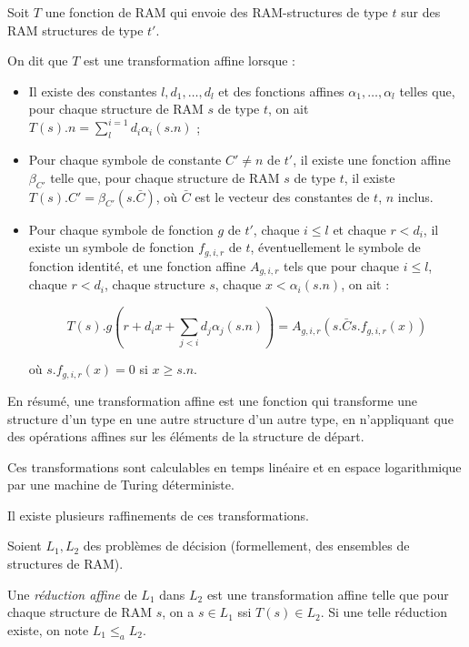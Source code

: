 		\begin{definition}
			\label{def:transfo_affine}
			Soit $T$ une fonction de RAM qui envoie des RAM-structures de type $t$ sur des RAM structures de type $t'$. 
			
			On dit que $T$ est une transformation affine lorsque : 
			
	
			\begin{itemize}[itemsep=-1mm]
				\item 	Il existe des constantes $l, d_1, \dots, d_l$ et des fonctions affines $\alpha_1, \dots, \alpha_l$ telles que, pour chaque structure de RAM $s$ de type $t$, on ait $T(s).n = \sum_{l}^{i=1} d_i \alpha_i(s.n)$ ;

				\item 	Pour chaque symbole de constante $C' \neq n$ de $t'$, il existe une fonction affine $\beta_{C'}$ telle que, pour chaque structure de RAM $s$ de type $t$, il existe $T(s).C' = \beta_{C'}\left( s.\bar{C} \right)$, où $\bar{C}$ est le vecteur des constantes de $t$, $n$ inclus. 
				
				\item 	Pour chaque symbole de fonction $g$ de $t'$, chaque $i \leqslant l$ et chaque $r < d_i$, il existe un symbole de fonction $f_{g,i,r}$ de $t$, éventuellement le symbole de fonction identité, et une fonction affine $A_{g,i,r}$ tels que pour chaque $i \leqslant l$, chaque $r < d_i$, chaque structure $s$, chaque $x < \alpha_i(s.n)$, on ait : 
				
					\[
						T(s).g\left( r + d_i x + \sum_{j<i} d_j \alpha_j(s.n) \right) = A_{g,i,r}\left( s.\bar{C} s.f_{g,i,r}(x) \right)
					\]
					
					où $s.f_{g,i,r}(x) = 0$ si $x \geqslant s.n$.
			\end{itemize}
		\end{definition}
		
		En résumé, une transformation affine est une fonction qui transforme une structure d'un type en une autre structure d'un autre type, en n'appliquant que des opérations affines sur les éléments de la structure de départ. 
		
		Ces transformations sont calculables en temps linéaire et en espace logarithmique par une machine de Turing déterministe. 

		\espace

		Il existe plusieurs raffinements de ces transformations.
		
		\begin{definition}
			\label{def:reduc_affine}
			
			Soient $L_1, L_2$ des problèmes de décision (formellement, des ensembles de structures de RAM). 
			
			Une \emph{réduction affine} de $L_1$ dans $L_2$ est une transformation affine telle que pour chaque structure de RAM $s$, on a $s \in L_1$ ssi $T(s) \in L_2$. Si une telle réduction existe, on note $L_1 \leqslant_a L_2$.
		\end{definition}
		
